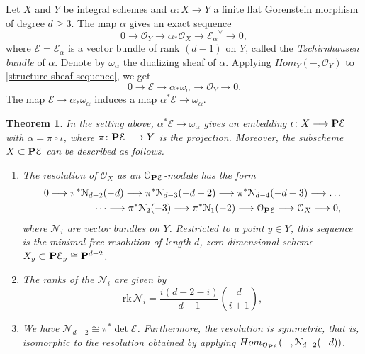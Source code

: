 \documentclass[reqno, 10 pt]{article}
\newtheorem{thm}{Theorem}
\theoremstyle{definition}
\theoremstyle{remark}
\numberwithin{equation}{section}
\numberwithin{thm}{section}
\numberwithin{prop}{section}
\numberwithin{lem}{section}
\numberwithin{cor}{section}
\numberwithin{conj}{section}
\numberwithin{defn}{section}
\renewcommand{\to}{\longrightarrow}
\newcommand{\cE}{{\mathcal E}}
\newcommand{\cN}{{\mathcal N}}
\newcommand{\cO}{{\mathcal O}}
\renewcommand{\P}{{\bf P}}
\newcommand {\from}{{\colon}}
\newcommand{\rk}{{\text{rk}\,}}
\begin{document}
 Let $X$ and $Y$ be integral schemes and $\alpha \from X \to Y$ a finite flat Gorenstein morphism of degree $d \geq 3$. The map $\alpha$ gives an exact sequence
\begin{equation}\label{structure sheaf sequence}
  0 \to \cO_Y \to \alpha_* \cO_X \to {\cE_\alpha}^\vee \to 0,
\end{equation}
where $\cE = \cE_\alpha$ is a vector bundle of rank $(d-1)$ on $Y$, called the \emph{Tschirnhausen bundle} of $\alpha$. Denote by $\omega_\alpha$ the dualizing sheaf of $\alpha$. Applying $Hom_Y(-,\cO_Y)$ to \eqref{structure sheaf sequence}, we get
\begin{equation}\label{dual structure sheaf sequence}
  0 \to \cE \to \alpha_* \omega_\alpha \to \cO_Y \to 0.
\end{equation}
The map $\cE \to \alpha_* \omega_\alpha$ induces a map $\alpha^* \cE \to \omega_\alpha$. 

\begin{thm}\label{thm:CE}
  \cite[Theorem~2.1]{casnati96:_cover_of_algeb_variet_i}
  In the setting above, $\alpha^* \cE \to \omega_\alpha$ gives an embedding $\iota \from X \to \P \cE$ with $\alpha  = \pi \circ \iota$, where $\pi \from \P \cE \to Y$ is the projection. Moreover, the subscheme $X \subset \P \cE$ can be described as follows.
\begin{enumerate}
\item The resolution of $\cO_X$ as an $\cO_{\P \cE}$-module has the form
\begin{equation}\label{eqn:casnati_resolution}
  \begin{split}
    0 \to \pi^* \cN_{d-2} (-d) \to \pi^* \cN_{d-3}(-d+2) \to \pi^*\cN_{d-4}(-d+3) \to \dots \\
    \dots \to \pi^*\cN_2(-3) \to \pi^*\cN_1(-2) \to \cO_{\P \cE} \to \cO_X \to 0,
  \end{split}
\end{equation}
where $\cN_i$ are vector bundles on $Y$. Restricted to a point $y \in Y$, this sequence is the minimal free resolution of length $d$, zero dimensional scheme $X_y \subset \P \cE_y\cong \P^{d-2}$.
\item The ranks of the $\cN_i$ are given by
  \[ \rk \cN_i = \frac{i(d-2-i)}{d-1} {d \choose {i+1}},\]
\item We have $\cN_{d-2} \cong \pi^* \det \cE$. Furthermore, the resolution is symmetric, that is, isomorphic to the resolution obtained by applying $Hom_{\cO_{\P \cE}}(-, \cN_{d-2}(-d))$.
\end{enumerate}
\end{thm}
\end{document}

